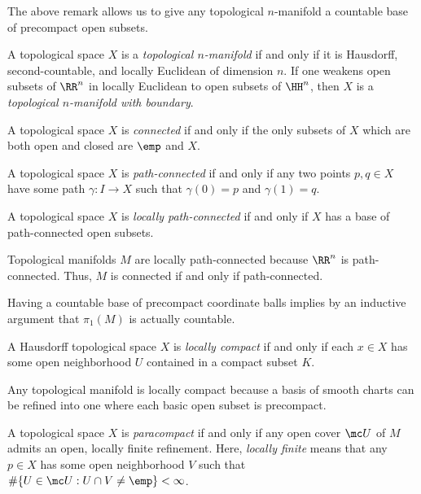 \documentclass{article}
\begin{document}
\begin{remark}
	The above remark allows us to give any topological $n$-manifold a countable base of precompact open subsets.
\end{remark}
\begin{definition}
	A topological space $X$ is a \textit{topological $n$-manifold} if and only if it is Hausdorff, second-countable, and locally Euclidean of dimension $n$. If one weakens open subsets of $\RR^n$ in locally Euclidean to open subsets of $\HH^n$, then $X$ is a \textit{topological $n$-manifold with boundary}.
\end{definition}
\begin{definition}[connected]
	A topological space $X$ is \textit{connected} if and only if the only subsets of $X$ which are both open and closed are $\emp$ and $X$.
\end{definition}
\begin{definition}
	A topological space $X$ is \textit{path-connected} if and only if any two points $p,q\in X$ have some path $\gamma\colon I\to X$ such that $\gamma(0)=p$ and $\gamma(1)=q$.
\end{definition}
\begin{definition}
	A topological space $X$ is \textit{locally path-connected} if and only if $X$ has a base of path-connected open subsets.
\end{definition}
\begin{remark}
	Topological manifolds $M$ are locally path-connected because $\RR^n$ is path-connected. Thus, $M$ is connected if and only if path-connected.
\end{remark}
\begin{remark}
	Having a countable base of precompact coordinate balls implies by an inductive argument that $\pi_1(M)$ is actually countable.
\end{remark}
\begin{definition}
	A Hausdorff topological space $X$ is \textit{locally compact} if and only if each $x\in X$ has some open neighborhood $U$ contained in a compact subset $K$.
\end{definition}
\begin{remark}
	Any topological manifold is locally compact because a basis of smooth charts can be refined into one where each basic open subset is precompact.
\end{remark}
\begin{definition}[paracompact]
	A topological space $X$ is \textit{paracompact} if and only if any open cover $\mc U$ of $M$ admits an open, locally finite refinement. Here, \textit{locally finite} means that any $p\in X$ has some open neighborhood $V$ such that $\#\{U\in\mc U:U\cap V\ne\emp\}<\infty$.
\end{definition}
\end{document}
